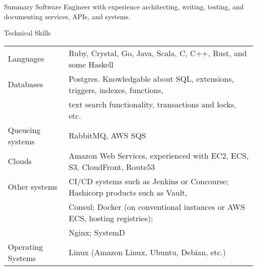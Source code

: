 \documentclass{resume} %
\begin{document}
\begin{rSection}{Summary}
	Software Engineer with experience architecting, writing, testing, and documenting services, APIs, and systems.
\end{rSection}

\begin{rSection}{Technical Skills}
	\begin{table}[h]
		\centering
		\begin{tabular}{ l l }
			Languages & Ruby, Crystal, Go, Java, Scala, C, C++, Rust, and some Haskell \\
			Databases & Postgres. Knowledgable about SQL, extensions, triggers, indexes, functions, \\
			& text search functionality, transactions and locks, etc. \\
			Queueing systems & RabbitMQ, AWS SQS \\
			Clouds & Amazon Web Services, experienced with EC2, ECS, S3, CloudFront, Route53 \\
			Other systems & CI/CD systems such as Jenkins or Concourse; Hashicorp products such as Vault, \\
			& Consul; Docker (on conventional instances or AWS ECS, hosting registries); \\
			& Nginx; SystemD \\
			Operating Systems & Linux (Amazon Linux, Ubuntu, Debian, etc.) \\
		\end{tabular}
	\end{table}
\end{rSection}
\end{document}
